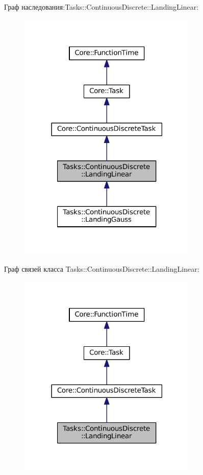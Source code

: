 Граф наследования\+:Tasks\+:\+:Continuous\+Discrete\+:\+:Landing\+Linear\+:\nopagebreak
\begin{figure}[H]
\begin{center}
\leavevmode
\includegraphics[width=242pt]{class_tasks_1_1_continuous_discrete_1_1_landing_linear__inherit__graph}
\end{center}
\end{figure}


Граф связей класса Tasks\+:\+:Continuous\+Discrete\+:\+:Landing\+Linear\+:\nopagebreak
\begin{figure}[H]
\begin{center}
\leavevmode
\includegraphics[width=242pt]{class_tasks_1_1_continuous_discrete_1_1_landing_linear__coll__graph}
\end{center}
\end{figure}


